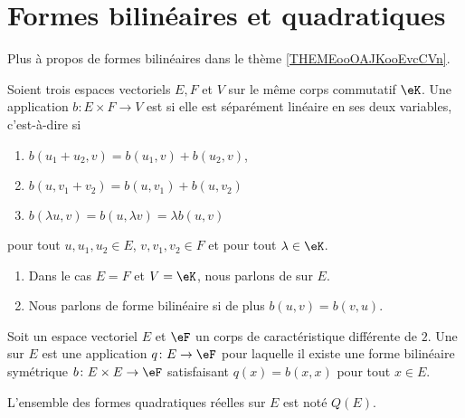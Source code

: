 

\section{Formes bilinéaires et quadratiques}

Plus à propos de formes bilinéaires dans le thème \ref{THEMEooOAJKooEvcCVn}.

\begin{definition}      \label{DEFooEEQGooNiPjHz}
	Soient trois espaces vectoriels \( E,F\) et \( V\) sur le même corps commutatif \( \eK\). Une application \( b\colon E\times F\to V\) est  si elle est séparément linéaire en ses deux variables, c'est-à-dire si
	\begin{enumerate}
		\item
		      \( b(u_1+u_2,v)=b(u_1,v)+b(u_2,v)\),
		\item
		      \( b(u,v_1+v_2)=b(u,v_1)+b(u,v_2)\)
		\item
		      \( b(\lambda u,v)=b(u,\lambda v)=\lambda b(u,v)\)
	\end{enumerate}
	pour tout \( u,u_1,u_2\in E\), \( v,v_1,v_2\in F\) et pour tout \( \lambda\in \eK\).

	\begin{enumerate}
		\item

		      Dans le cas \( E=F\) et \( V=\eK\), nous parlons de  sur \( E\).
		\item

		      Nous parlons de forme bilinéaire  si de plus \( b(u,v)=b(v,u)\).
	\end{enumerate}
\end{definition}


\begin{definition}   \label{DefBSIoouvuKR}
	Soit un espace vectoriel \( E\) et \( \eF\) un corps de caractéristique différente de \( 2\). Une  sur \( E\) est une application \( q\colon E\to \eF\) pour laquelle il existe une forme bilinéaire symétrique \( b\colon E\times E\to \eF\) satisfaisant \( q(x)=b(x,x)\) pour tout \( x\in E\).

	L'ensemble des formes quadratiques réelles sur \( E\) est noté \( Q(E)\).

\end{definition}

